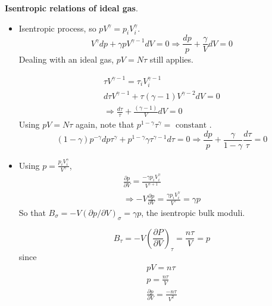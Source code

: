   \textbf{Isentropic relations of ideal gas}. 
\begin{itemize}
\item[(a)] 
Isentropic process, so $pV^{\gamma} = p_i V_i^{\gamma}$.  
\[
V^{ \gamma} dp + \gamma p V^{\gamma -1} dV = 0 \Longrightarrow \boxed{ \frac{dp}{p} + \frac{ \gamma}{ V} dV = 0 }
\]
Dealing with an ideal gas, $pV = N\tau$ still applies.  

\[
\begin{gathered}
  \tau V^{\gamma - 1 } = \tau_i V_i^{\gamma -1 } \\ 
  d\tau V^{\gamma - 1 } + \tau (\gamma - 1 ) V^{\gamma - 2 } dV = 0 \\
\Longrightarrow \boxed{   \frac{d\tau}{\tau} + \frac{ (\gamma - 1)}{ V} dV = 0  }
\end{gathered}
\]
Using $pV = N\tau$ again, note that $p^{1- \gamma} \tau^{\gamma} = \text{ constant }$.  
\[
(1- \gamma ) p^{-\gamma} dp \tau^{\gamma} + p^{1-\gamma} \gamma \tau^{\gamma - 1} d\tau =0 \Longrightarrow \boxed{ \frac{dp }{p} + \frac{ \gamma}{ 1 - \gamma} \frac{d\tau}{ \tau} = 0 }
\]
\item[(b)] Using $p = \frac{ p_i V_i^{\gamma}}{ V^{\gamma}}$, 
\[
\begin{gathered}
  \frac{ \partial p}{ \partial V} = \frac{- \gamma p_i V_i^{\gamma}}{ V^{\gamma + 1 } } \\
  \Longrightarrow -V \frac{ \partial p }{ \partial V} = \frac{ \gamma p_i V_i^{\gamma} }{V^{\gamma}} =  \gamma p
\end{gathered}
\]
So that $B_{\sigma} = -V(\partial p/ \partial V)_{\sigma} = \gamma p$, the isentropic bulk moduli.  

\[
B_{\tau} = -V \left( \frac{ \partial P }{ \partial V} \right)_{\tau} = \frac{ n \tau}{V} = p
\]
since 
\[
\begin{gathered}
  pV = n\tau \\ 
  p = \frac{ n \tau}{V} \\
  \frac{ \partial p}{\partial V} = \frac{- n \tau}{ V^2}
\end{gathered}
\]
\end{itemize}

